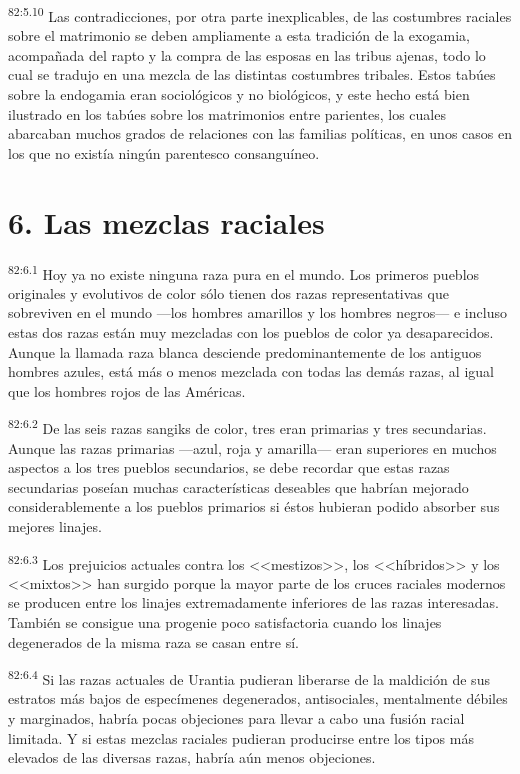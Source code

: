 \documentclass[twoside, 11pt]{book}
\begin{document}
\par
\textsuperscript{82:5.10} Las contradicciones, por otra parte inexplicables, de las costumbres raciales sobre el matrimonio se deben ampliamente a esta tradición de la exogamia, acompañada del rapto y la compra de las esposas en las tribus ajenas, todo lo cual se tradujo en una mezcla de las distintas costumbres tribales. Estos tabúes sobre la endogamia eran sociológicos y no biológicos, y este hecho está bien ilustrado en los tabúes sobre los matrimonios entre parientes, los cuales abarcaban muchos grados de relaciones con las familias políticas, en unos casos en los que no existía ningún parentesco consanguíneo.

\section*{6. Las mezclas raciales}
\par
\textsuperscript{82:6.1} Hoy ya no existe ninguna raza pura en el mundo. Los primeros pueblos originales y evolutivos de color sólo tienen dos razas representativas que sobreviven en el mundo ---los hombres amarillos y los hombres negros--- e incluso estas dos razas están muy mezcladas con los pueblos de color ya desaparecidos. Aunque la llamada raza blanca desciende predominantemente de los antiguos hombres azules, está más o menos mezclada con todas las demás razas, al igual que los hombres rojos de las Américas.

\par
\textsuperscript{82:6.2} De las seis razas sangiks de color, tres eran primarias y tres secundarias. Aunque las razas primarias ---azul, roja y amarilla--- eran superiores en muchos aspectos a los tres pueblos secundarios, se debe recordar que estas razas secundarias poseían muchas características deseables que habrían mejorado considerablemente a los pueblos primarios si éstos hubieran podido absorber sus mejores linajes.

\par
\textsuperscript{82:6.3} Los prejuicios actuales contra los <<mestizos>>, los <<híbridos>> y los <<mixtos>> han surgido porque la mayor parte de los cruces raciales modernos se producen entre los linajes extremadamente inferiores de las razas interesadas. También se consigue una progenie poco satisfactoria cuando los linajes degenerados de la misma raza se casan entre sí.

\par
\textsuperscript{82:6.4} Si las razas actuales de Urantia pudieran liberarse de la maldición de sus estratos más bajos de especímenes degenerados, antisociales, mentalmente débiles y marginados, habría pocas objeciones para llevar a cabo una fusión racial limitada. Y si estas mezclas raciales pudieran producirse entre los tipos más elevados de las diversas razas, habría aún menos objeciones.
\end{document}
